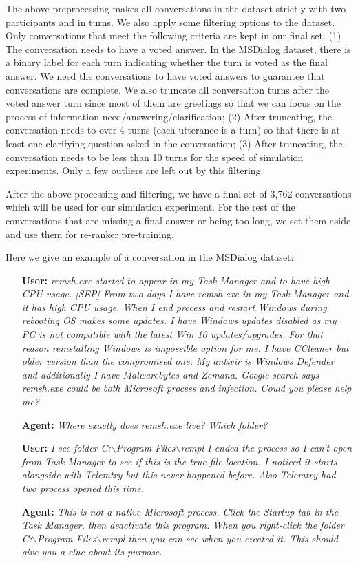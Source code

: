 \documentclass[format=acmsmall, review=False, screen=true]{acmart}
\begin{document}
The above preprocessing makes all conversations in the dataset strictly with two participants and in turns. We also apply some filtering options to the dataset. Only conversations that meet the following criteria are kept in our final set: (1) The conversation needs to have a voted answer. In the MSDialog dataset, there is a binary label for each turn indicating whether the turn is voted as the final answer. We need the conversations to have voted answers to guarantee that conversations are complete. We also truncate all conversation turns after the voted answer turn since most of them are greetings so that we can focus on the process of information need/answering/clarification; (2) After truncating, the conversation needs to over 4 turns (each utterance is a turn) so that there is at least one clarifying question asked in the conversation; (3) After truncating, the conversation needs to be less than 10 turns for the speed of simulation experiments. Only a few outliers are left out by this filtering. 

After the above processing and filtering, we have a final set of 3,762 conversations which will be used for our simulation experiment. For the rest of the conversations that are missing a final answer or being too long, we set them aside and use them for re-ranker pre-training. 

Here we give an example of a conversation in the MSDialog dataset:

\begin{itemize}
    \item[\textbf{User:}] \textit{remsh.exe started to appear in my Task Manager and to have high CPU usage. [SEP] From two days I have remsh.exe in my Task Manager and it has high CPU usage. When I end process and restart Windows during rebooting OS makes some updates. I have Windows updates disabled as my PC is not compatible with the latest Win 10 updates/upgrades. For that reason reinstalling Windows is impossible option for me. I have CCleaner but older version than the compromised one. My antivir is Windows Defender and additionally I have Malwarebytes and Zemana. Google search says remsh.exe could be both Microsoft process and infection. Could you please help me?}
    
    \item[\textbf{Agent:}] \textit{Where exactly does remsh.exe live? Which folder?}
    
    \item[\textbf{User:}] \textit{I see folder C:$\backslash$Program Files$\backslash$rempl I ended the process so I can't open from Task Manager to see if this is the true file location. I noticed it starts alongside with Telemtry but this never happened before. Also Telemtry had two process opened this time.}

    \item[\textbf{Agent:}] \textit{This is not a native Microsoft process. Click the Startup tab in the Task Manager, then deactivate this program. When you right-click the folder C:$\backslash$Program Files$\backslash$rempl then you can see when you created it. This should give you a clue about its purpose.}
    
\end{itemize}
\end{document}
